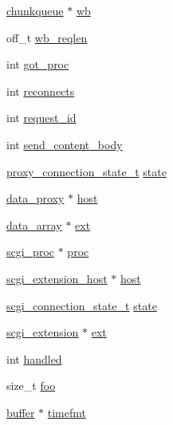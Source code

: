 \begin{DoxyCompactItemize}
\hyperlink{structchunkqueue}{chunkqueue} $\ast$ \hyperlink{structhandler__ctx_a9e6e88621885a181db128efaf713065e}{wb}
\item 
off\-\_\-t \hyperlink{structhandler__ctx_a3a2074126d76e92f976772c2a22c663b}{wb\-\_\-reqlen}
\item 
int \hyperlink{structhandler__ctx_ad75f27a3509dacba99feb90f93827e4d}{got\-\_\-proc}
\item 
int \hyperlink{structhandler__ctx_aa8c753ade7eab6cca866898805b49773}{reconnects}
\item 
int \hyperlink{structhandler__ctx_a07b80fc0931f7f0db765784c1f9dfce6}{request\-\_\-id}
\item 
int \hyperlink{structhandler__ctx_a1583c769132edef095dd9e9255e7c23b}{send\-\_\-content\-\_\-body}
\item 
\hyperlink{mod__proxy_8c_a02dc6a96fad1fa4cc37f695206e40381}{proxy\-\_\-connection\-\_\-state\-\_\-t} \hyperlink{structhandler__ctx_a49e55dfa1741b510b000d8fe5704b16c}{state}
\item 
\hyperlink{mod__proxy_8c_aee2339951c17205bed17e9ef9b3fee9b}{data\-\_\-proxy} $\ast$ \hyperlink{structhandler__ctx_a8b29717d9d3238a7d971ebbbb6c05cb8}{host}
\item 
\hyperlink{structdata__array}{data\-\_\-array} $\ast$ \hyperlink{structhandler__ctx_abb79ce25f2dad69970a556bedb47c1e6}{ext}
\item 
\hyperlink{structscgi__proc}{scgi\-\_\-proc} $\ast$ \hyperlink{structhandler__ctx_a8722a28e5d9e229cbe6fe97b697a0f86}{proc}
\item 
\hyperlink{structscgi__extension__host}{scgi\-\_\-extension\-\_\-host} $\ast$ \hyperlink{structhandler__ctx_ab891690867b39c474b01611d885f4633}{host}
\item 
\hyperlink{mod__scgi_8c_a18cca316a84b739faaa855eacca0cac1}{scgi\-\_\-connection\-\_\-state\-\_\-t} \hyperlink{structhandler__ctx_a127fecd40c1c20963cbbc2f44dcf4775}{state}
\item 
\hyperlink{structscgi__extension}{scgi\-\_\-extension} $\ast$ \hyperlink{structhandler__ctx_a937879800a0203f31a86a445a8591bfe}{ext}
\item 
int \hyperlink{structhandler__ctx_a9366379955fcb32c274ea4c0d21a2f15}{handled}
\item 
size\-\_\-t \hyperlink{structhandler__ctx_a9d0337b80c0479f8e08a4eec7c780fca}{foo}
\item 
\hyperlink{structbuffer}{buffer} $\ast$ \hyperlink{structhandler__ctx_a0dd810f44dd72b1584e2e2fd90dea6f0}{timefmt}
\item 

\end{DoxyCompactItemize}
